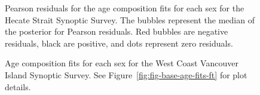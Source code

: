 \documentclass[11pt]{book}
\begin{document}
\begin{figure}[H]

{\centering {} 

}

\caption{Pearson residuals for the age composition fits for each sex for the Hecate Strait Synoptic Survey. The bubbles represent the median of the posterior for Pearson residuals. Red bubbles are negative residuals, black are positive, and dots represent zero residuals.}\label{fig:fig-base-age-resids-hss}
\end{figure}
\clearpage




\begin{figure}[H]

{\centering {} 

}

\caption{Age composition fits for each sex for the West Coast Vancouver Island Synoptic Survey. See Figure~\ref{fig:fig-base-age-fits-ft} for plot details.}\label{fig:fig-base-age-fits-wcvis}
\end{figure}
\end{document}
